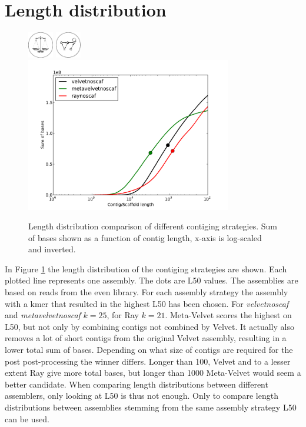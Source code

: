 \documentclass[a4paper,12pt]{report}
\begin{document}
\section{Length distribution}
\label{res:len}
\begin{figure}[ht!]
  \centering
    \includegraphics[width=0.1\textwidth]{figures/logos/even.png}
    \includegraphics[width=0.1\textwidth]{figures/logos/contig.png}\\
  \centering
    \includegraphics[width=0.8\textwidth,trim=35 20 35 33, clip]{figures/notebooks/chris-mock-length-distribution/even-contig.pdf}
  \caption{Length distribution comparison of different contiging strategies.
      Sum of bases shown as a function of contig length, x-axis is log-scaled
      and inverted. }
  \label{fig:length-distribution-even-contig-length}
\end{figure}

In Figure \ref{fig:length-distribution-even-contig-length} the length
distribution of the contiging strategies are shown. Each plotted line
represents one assembly. The dots are L50 values. The assemblies are based on
reads from the even library. For each assembly strategy the assembly with a
kmer that resulted in the highest L50 has been chosen. For {\em velvetnoscaf}
and {\em metavelvetnoscaf} $k=25$, for Ray $k=21$. Meta-Velvet scores the
highest on L50, but not only by combining contigs not combined by Velvet.  It
actually also removes a lot of short contigs from the original Velvet assembly,
resulting in a lower total sum of bases. Depending on what size of contigs are
required for the post post-processing the winner differs. Longer than 100,
Velvet and to a lesser extent Ray give more total bases, but longer than 1000
Meta-Velvet would seem a better candidate. When comparing length distributions
between different assemblers, only looking at L50 is thus not enough. Only to
compare length distributions between assemblies stemming from the same assembly
strategy L50 can be used.\\
\end{document}
